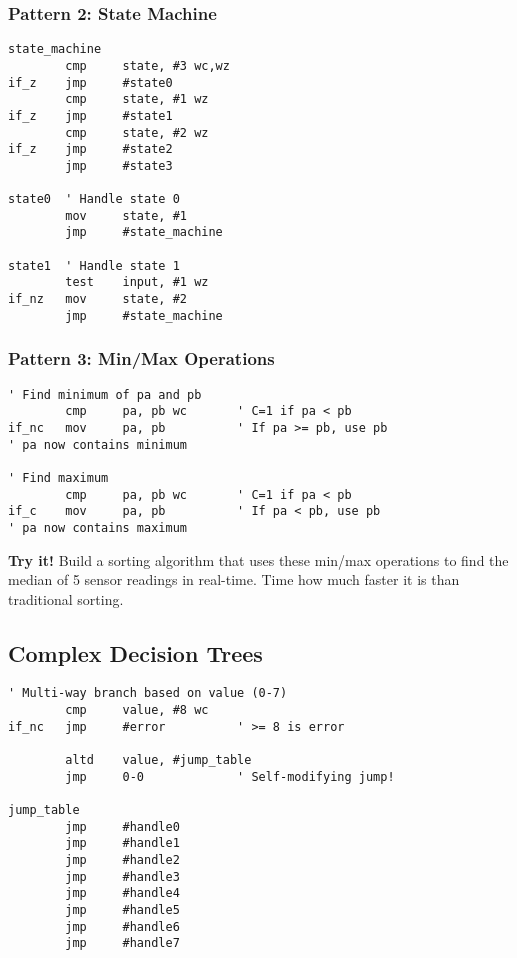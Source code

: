 \documentclass[11pt]{book}
\begin{document}
\hypertarget{pattern-2-state-machine}{%
\subsubsection{Pattern 2: State Machine}\label{pattern-2-state-machine}}

\begin{lstlisting}
state_machine
        cmp     state, #3 wc,wz
if_z    jmp     #state0
        cmp     state, #1 wz
if_z    jmp     #state1
        cmp     state, #2 wz
if_z    jmp     #state2
        jmp     #state3

state0  ' Handle state 0
        mov     state, #1
        jmp     #state_machine
        
state1  ' Handle state 1
        test    input, #1 wz
if_nz   mov     state, #2
        jmp     #state_machine
\end{lstlisting}

\hypertarget{pattern-3-minmax-operations}{%
\subsubsection{Pattern 3: Min/Max
Operations}\label{pattern-3-minmax-operations}}

\begin{lstlisting}
' Find minimum of pa and pb
        cmp     pa, pb wc       ' C=1 if pa < pb
if_nc   mov     pa, pb          ' If pa >= pb, use pb
' pa now contains minimum

' Find maximum
        cmp     pa, pb wc       ' C=1 if pa < pb  
if_c    mov     pa, pb          ' If pa < pb, use pb
' pa now contains maximum
\end{lstlisting}

\textbf{Try it!} Build a sorting algorithm that uses these min/max
operations to find the median of 5 sensor readings in real-time. Time
how much faster it is than traditional sorting.

\hypertarget{complex-decision-trees}{%
\subsection{Complex Decision Trees}\label{complex-decision-trees}}

\begin{lstlisting}
' Multi-way branch based on value (0-7)
        cmp     value, #8 wc
if_nc   jmp     #error          ' >= 8 is error
        
        altd    value, #jump_table
        jmp     0-0             ' Self-modifying jump!
        
jump_table
        jmp     #handle0
        jmp     #handle1
        jmp     #handle2
        jmp     #handle3
        jmp     #handle4
        jmp     #handle5
        jmp     #handle6
        jmp     #handle7
\end{lstlisting}
\end{document}
